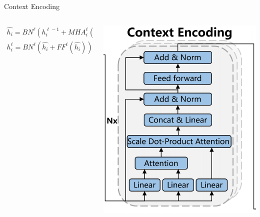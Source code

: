 \documentclass{beamer}
\begin{document}
\begin{frame}{Context Encoding}
	\begin{columns}
		\begin{column}{0.6\textwidth}
			\footnotesize
			\begin{align}
				\hat{h_{i}}=BN^{\ell}(h_{i}^{\ell-1}+MHA_{i}^{\ell}(h_{1}^{\ell-1},h_{2}^{\ell-1},\cdots h_{2N}^{\ell-1})),
			\end{align}
			\begin{align}
				h_{i}^{\ell}=BN^{\ell}(\hat{h_{i}}+FF^{\ell}(\hat{h_{i}})).
			\end{align}
		\end{column}
		\begin{column}{0.4\textwidth}
			\centering
			\includegraphics[width=\textwidth]{CE.png} %
		\end{column}
	\end{columns}
\end{frame}
\end{document}
